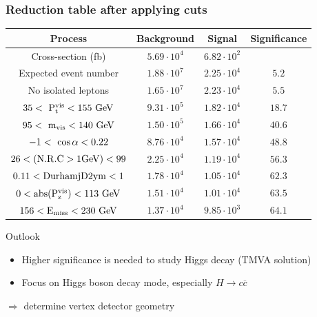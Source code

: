 \documentclass{beamer}
\begin{document}
\begin{frame}
    \frametitle{Reduction table after applying cuts}

    \hspace{-0.7cm}
    \centering 
    \footnotesize{ 
                \begin{tabular}{c c c c}
      \hline
      Process                                     & Background          & Signal              & Significance  \tabularnewline
      \hline
      \hline
      Cross-section (fb)                          & $5.69 \cdot 10^{4}$ & $6.82 \cdot 10^{2}$ &               \tabularnewline
      \hline
      Expected event number                       & $1.88 \cdot 10^{7}$ & $2.25 \cdot 10^{4}$ & $5.2$         \tabularnewline
      No isolated leptons                         & $1.65 \cdot 10^{7}$ & $2.23 \cdot 10^{4}$ & $5.5$         \tabularnewline
      {$35 <~\rm{{P}_{t}^{vis}} < 155~\rm{GeV} $} & $9.31 \cdot 10^{5}$ & $1.82 \cdot 10^{4}$ & $18.7$        \tabularnewline
      {$95 <~\rm{m_{vis}}< 140~\rm{GeV}$}         & $1.50 \cdot 10^{5}$ & $1.66 \cdot 10^{4}$ & $40.6$        \tabularnewline
      {$-1 <~\rm{\cos{\alpha}}< 0.22$}            & $8.76 \cdot 10^{4}$ & $1.57 \cdot 10^{4}$ & $48.8$        \tabularnewline
      $26 < (\rm{N.R.C > 1GeV}) < 99$             & $2.25 \cdot 10^{4}$ & $1.19 \cdot 10^{4}$ & $56.3$        \tabularnewline
      $0.11 < \rm{DurhamjD2ym} < 1$               & $1.78 \cdot 10^{4}$ & $1.05 \cdot 10^{4}$ & $62.3$        \tabularnewline
      $0 < \rm{abs(P_{z}^{vis})} < 113~\rm{GeV}$& $1.51 \cdot 10^{4}$ & $1.01 \cdot 10^{4}$ & $63.5$        \tabularnewline
      $156 < \rm{E_{miss}} < 230~\rm{GeV}$   & $1.37 \cdot 10^{4}$ & $9.85 \cdot 10^{3}$ & $64.1$        \tabularnewline      
      \hline %
    \end{tabular}
   }
   \begin{block}{Outlook}
     \begin{itemize}
       \item Higher significance is needed to study Higgs decay (TMVA solution)
       \item Focus on Higgs boson decay mode, especially $H \rightarrow c \overline{c}$ 
     \end{itemize}
     \centering
     $\Rightarrow$ determine vertex detector geometry  
   \end{block}
\end{frame}

\end{document}
